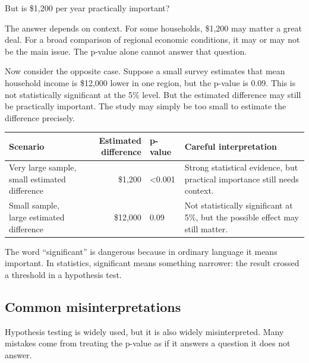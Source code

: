 \documentclass[
  letterpaper,
  DIV=11,
  numbers=noendperiod]{scrreprt}
\begin{document}
But is \$1,200 per year practically important?

The answer depends on context. For some households, \$1,200 may matter a
great deal. For a broad comparison of regional economic conditions, it
may or may not be the main issue. The p-value alone cannot answer that
question.

Now consider the opposite case. Suppose a small survey estimates that
mean household income is \$12,000 lower in one region, but the p-value
is 0.09. This is not statistically significant at the 5\% level. But the
estimated difference may still be practically important. The study may
simply be too small to estimate the difference precisely.

\begin{table}
\fontsize{12.0pt}{14.0pt}\selectfont
\begin{tabular*}{\linewidth}{@{\extracolsep{\fill}}lrll}
\toprule
Scenario & Estimated difference & p-value & Careful interpretation \\ 
\midrule\addlinespace[2.5pt]
Very large sample, small estimated difference & \$1,200 & <0.001 & Strong statistical evidence, but practical importance still needs context. \\ 
Small sample, large estimated difference & \$12,000 & 0.09 & Not statistically significant at 5\%, but the possible effect may still matter. \\ 
\bottomrule
\end{tabular*}
\end{table}

The word ``significant'' is dangerous because in ordinary language it
means important. In statistics, significant means something narrower:
the result crossed a threshold in a hypothesis test.

\subsection{Common misinterpretations}\label{common-misinterpretations}

Hypothesis testing is widely used, but it is also widely misinterpreted.
Many mistakes come from treating the p-value as if it answers a question
it does not answer.
\end{document}
